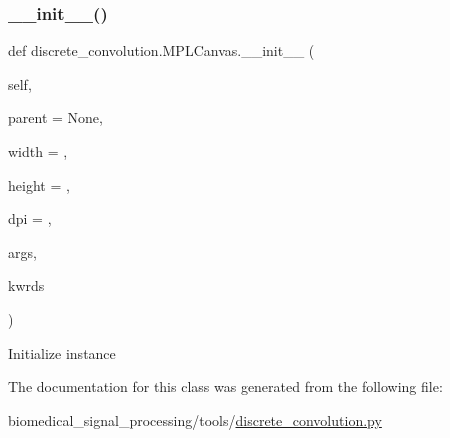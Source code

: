 \subsubsection{\texorpdfstring{\+\_\+\+\_\+init\+\_\+\+\_\+()}{\_\_init\_\_()}}
{\footnotesize\ttfamily def discrete\+\_\+convolution.\+M\+P\+L\+Canvas.\+\_\+\+\_\+init\+\_\+\+\_\+ (\begin{DoxyParamCaption}\item[{}]{self,  }\item[{}]{parent = {\ttfamily None},  }\item[{}]{width = {},  }\item[{}]{height = {},  }\item[{}]{dpi = {},  }\item[{}]{args,  }\item[{}]{kwrds }\end{DoxyParamCaption})}

\begin{DoxyVerb}Initialize instance
\end{DoxyVerb}
 

The documentation for this class was generated from the following file\+:\begin{DoxyCompactItemize}
\item 
biomedical\+\_\+signal\+\_\+processing/tools/\hyperlink{discrete__convolution_8py}{discrete\+\_\+convolution.\+py}\end{DoxyCompactItemize}
